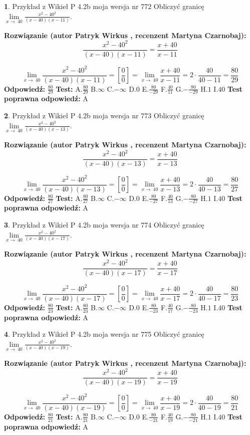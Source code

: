 \documentclass[12pt, a4paper]{article}
\theoremstyle{definition} %
\newtheorem{zad}{}
\newcommand{\zadStart}[1]{\begin{zad}#1\newline}
\newcommand{\zadStop}{\end{zad}}
\newcommand{\rozwStart}[2]{\noindent \textbf{Rozwiązanie (autor #1 , recenzent #2): }\newline}
\newcommand{\rozwStop}{\newline}
\newcommand{\odpStart}{\noindent \textbf{Odpowiedź:}\newline}
\newcommand{\odpStop}{\newline}
\newcommand{\testStart}{\noindent \textbf{Test:}\newline}
\newcommand{\testStop}{\newline}
\newcommand{\kluczStart}{\noindent \textbf{Test poprawna odpowiedź:}\newline}
\newcommand{\kluczStop}{\newline}
\begin{document}
\zadStart{Przykład z Wikieł P 4.2b moja wersja nr 772}
Obliczyć granicę $\lim\limits_{x\to\ 40}\frac{x^{2}-40^{2}}{(x-40)(x-11)}$.
\zadStop
\rozwStart{Patryk Wirkus}{Martyna Czarnobaj}
$$\frac{x^{2}-40^{2}}{(x-40)(x-11)}=\frac{x+40}{x-11}$$

$$\lim\limits_{x\to\ 40}\frac{x^{2}-40^{2}}{(x-40)(x-11)}=[\frac{0}{0}]=\lim\limits_{x\to\ 40}\frac{x+40}{x-11}=2 \cdot \frac{40}{40-11} = \frac{80}{29}$$
\rozwStop
\odpStart
$\frac{80}{29}$
\odpStop
\testStart
A.$\frac{80}{29}$
B.$\infty$
C.$-\infty$
D.$0$
E.$\frac{80}{-29}$
F.$\frac{40}{11}$
G.$-\frac{80}{-29}$
H.$1$
I.$40$
\testStop
\kluczStart
A
\kluczStop



\zadStart{Przykład z Wikieł P 4.2b moja wersja nr 773}
Obliczyć granicę $\lim\limits_{x\to\ 40}\frac{x^{2}-40^{2}}{(x-40)(x-13)}$.
\zadStop
\rozwStart{Patryk Wirkus}{Martyna Czarnobaj}
$$\frac{x^{2}-40^{2}}{(x-40)(x-13)}=\frac{x+40}{x-13}$$

$$\lim\limits_{x\to\ 40}\frac{x^{2}-40^{2}}{(x-40)(x-13)}=[\frac{0}{0}]=\lim\limits_{x\to\ 40}\frac{x+40}{x-13}=2 \cdot \frac{40}{40-13} = \frac{80}{27}$$
\rozwStop
\odpStart
$\frac{80}{27}$
\odpStop
\testStart
A.$\frac{80}{27}$
B.$\infty$
C.$-\infty$
D.$0$
E.$\frac{80}{-27}$
F.$\frac{40}{13}$
G.$-\frac{80}{-27}$
H.$1$
I.$40$
\testStop
\kluczStart
A
\kluczStop



\zadStart{Przykład z Wikieł P 4.2b moja wersja nr 774}
Obliczyć granicę $\lim\limits_{x\to\ 40}\frac{x^{2}-40^{2}}{(x-40)(x-17)}$.
\zadStop
\rozwStart{Patryk Wirkus}{Martyna Czarnobaj}
$$\frac{x^{2}-40^{2}}{(x-40)(x-17)}=\frac{x+40}{x-17}$$

$$\lim\limits_{x\to\ 40}\frac{x^{2}-40^{2}}{(x-40)(x-17)}=[\frac{0}{0}]=\lim\limits_{x\to\ 40}\frac{x+40}{x-17}=2 \cdot \frac{40}{40-17} = \frac{80}{23}$$
\rozwStop
\odpStart
$\frac{80}{23}$
\odpStop
\testStart
A.$\frac{80}{23}$
B.$\infty$
C.$-\infty$
D.$0$
E.$\frac{80}{-23}$
F.$\frac{40}{17}$
G.$-\frac{80}{-23}$
H.$1$
I.$40$
\testStop
\kluczStart
A
\kluczStop



\zadStart{Przykład z Wikieł P 4.2b moja wersja nr 775}
Obliczyć granicę $\lim\limits_{x\to\ 40}\frac{x^{2}-40^{2}}{(x-40)(x-19)}$.
\zadStop
\rozwStart{Patryk Wirkus}{Martyna Czarnobaj}
$$\frac{x^{2}-40^{2}}{(x-40)(x-19)}=\frac{x+40}{x-19}$$

$$\lim\limits_{x\to\ 40}\frac{x^{2}-40^{2}}{(x-40)(x-19)}=[\frac{0}{0}]=\lim\limits_{x\to\ 40}\frac{x+40}{x-19}=2 \cdot \frac{40}{40-19} = \frac{80}{21}$$
\rozwStop
\odpStart
$\frac{80}{21}$
\odpStop
\testStart
A.$\frac{80}{21}$
B.$\infty$
C.$-\infty$
D.$0$
E.$\frac{80}{-21}$
F.$\frac{40}{19}$
G.$-\frac{80}{-21}$
H.$1$
I.$40$
\testStop
\kluczStart
A
\kluczStop
\end{document}
